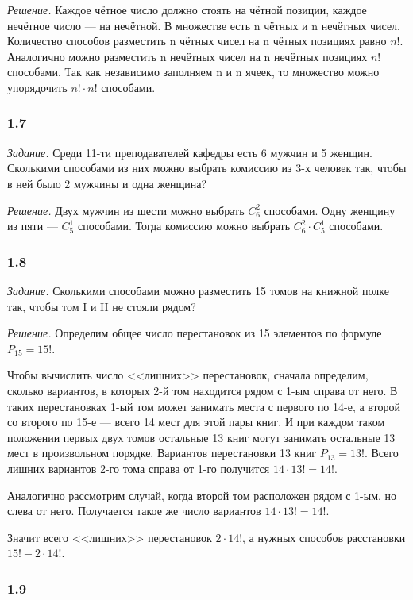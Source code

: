 \textit{Решение.} Каждое чётное число должно стоять на чётной позиции, каждое нечётное число --- на нечётной.
В множестве есть n чётных и n нечётных чисел.
Количество способов разместить n чётных чисел на n чётных позициях равно $n!$.
Аналогично можно разместить n нечётных чисел на n нечётных позициях $n!$ способами.
Так как независимо заполняем n и n ячеек, то множество можно упорядочить $n!\cdot n!$ способами.

\subsubsection*{1.7}

\textit{Задание.} Среди 11-ти преподавателей кафедры есть 6 мужчин и 5 женщин.
Сколькими способами из них можно выбрать комиссию из 3-х человек так, чтобы в ней было 2 мужчины и одна женщина?

\textit{Решение.} Двух мужчин из шести можно выбрать $C_6^2$ способами. 
Одну женщину из пяти --- $C_5^1$ способами.
Тогда комиссию можно выбрать $C_6^2\cdot C_5^1$ способами.

\subsubsection*{1.8}

\textit{Задание.} Сколькими способами можно разместить 15 томов на книжной полке так, чтобы том I и II не стояли рядом?

\textit{Решение.} Определим общее число перестановок из 15 элементов по формуле $P_{15}=15!$.

Чтобы вычислить число <<лишних>> перестановок, сначала определим, сколько вариантов, в которых 2-й том находится рядом с 1-ым справа от него.
В таких перестановках 1-ый том может занимать места с первого по 14-е, а второй со второго по 15-е --- всего 14 мест для этой пары книг.
И при каждом таком положении первых двух томов остальные 13 книг могут занимать остальные 13 мест в произвольном порядке.
Вариантов перестановки 13 книг $P_{13}=13!$.
Всего лишних вариантов 2-го тома справа от 1-го получится $14\cdot 13!=14!$.

Аналогично рассмотрим случай, когда второй том расположен рядом с 1-ым, но слева от него.
Получается такое же число вариантов $14\cdot 13!=14!$.

Значит всего <<лишних>> перестановок $2\cdot 14!$, а нужных способов расстановки $15!-2\cdot 14!$.

\subsubsection*{1.9}

